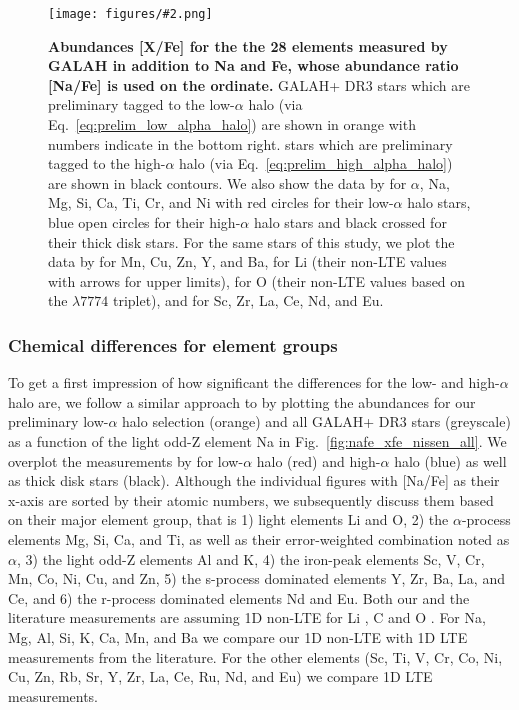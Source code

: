 \documentclass[fleqn,usenatbib]{mnras}
\newcommand{\added}[1]{#1}
\newcommand{\codeicon}{{\faCloudDownload}}
\newcommand{\codelink}[1]{\href{https://github.com/svenbuder/Accreted-stars-in-GALAH-DR3/tree/main/figures/#1.ipynb}{\codeicon}\,\,}
\newcommand{\oscaption}[2]{\caption{#2 \codelink{#1}}}
\newcommand{\figuretextwidth}[4]{\begin{figure*} \centering \texttt{[image: figures/\#2.png]}\oscaption{#3}{#4}\label{fig:#2} \end{figure*}}
\begin{document}
\figuretextwidth{17cm}{nafe_xfe_nissen_all_hah}{chemical_differences}{
\textbf{Abundances [X/Fe] for the the 28 elements measured by GALAH in addition to Na and Fe, whose abundance ratio [Na/Fe] is used on the ordinate.} GALAH+ DR3 stars which are preliminary tagged to the low-$\alpha$ halo (via Eq.~\ref{eq:prelim_low_alpha_halo}) are shown in orange with numbers indicate in the bottom right. stars which are preliminary tagged to the high-$\alpha$ halo (via Eq.~\ref{eq:prelim_high_alpha_halo}) are shown in black contours.
We also show the data by \citet{Nissen2010} for $\alpha$, Na, Mg, Si, Ca, Ti, Cr, and Ni with red circles for their low-$\alpha$ halo stars, blue open circles for their high-$\alpha$ halo stars and black crossed for their thick disk stars. For the same stars of this study, we plot the data by \citet{Nissen2011} for Mn, Cu, Zn, Y, and Ba, \citet{Nissen2012} for Li (their non-LTE values with arrows for upper limits), \citet{Nissen2014} for O (their non-LTE values based on the $\lambda 7774$ \ion{O}{i} triplet), and \citet{Fishlock2017} for Sc, Zr, La, Ce, Nd, and Eu.} 

\subsubsection{Chemical differences for element groups}

To get a first impression of how significant the differences for the low- and high-$\alpha$ halo are, we follow a similar approach to \citet[][see their Fig.~5]{Nissen2011} by plotting the abundances for our preliminary low-$\alpha$ halo selection (orange) and all GALAH+ DR3 stars (greyscale) as a function of the light odd-Z element Na in Fig.~\ref{fig:nafe_xfe_nissen_all}. We overplot the measurements by \citet{Nissen2010,Nissen2011,Nissen2014,Fishlock2017} for low-$\alpha$ halo (red) and high-$\alpha$ halo (blue) as well as thick disk stars (black). Although the individual figures with [Na/Fe] as their x-axis are sorted by their atomic numbers, we subsequently discuss them based on their major element group, that is 1) light elements Li and O, 2) the $\alpha$-process elements Mg, Si, Ca, and Ti, as well as their error-weighted combination noted as $\alpha$, 3) the light odd-Z elements Al and K, 4) the iron-peak elements Sc, V, Cr, Mn, Co, Ni, Cu, and Zn, 5) the s-process dominated elements Y, Zr, Ba, La, and Ce, and 6) the r-process dominated elements Nd and Eu.
\added{Both our and the literature measurements are assuming 1D non-LTE for Li \citet{Nissen2012}, C and O \citep{Nissen2014}. For Na, Mg, Al, Si, K, Ca, Mn, and Ba we compare our 1D non-LTE with 1D LTE measurements from the literature. For the other elements (Sc, Ti, V, Cr, Co, Ni, Cu, Zn, Rb, Sr, Y, Zr, La, Ce, Ru, Nd, and Eu) we compare 1D LTE measurements.}
\end{document}
